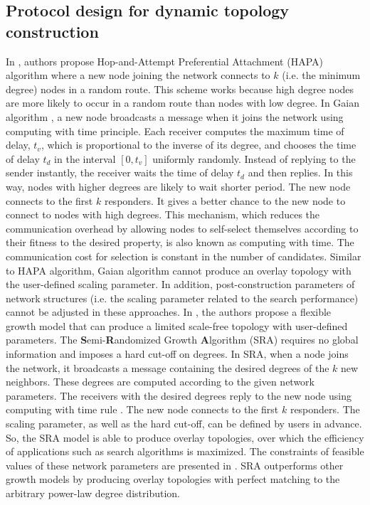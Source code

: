 \subsection{Protocol design for dynamic topology construction} 
In \cite{guclu2009limited}, authors propose Hop-and-Attempt Preferential Attachment (HAPA) algorithm\cite{guclu2009limited} where a new node joining the network connects to $k$ (i.e. the minimum degree) nodes in a random route. This scheme works because high degree nodes are more likely to occur in a random route than nodes with low degree. In Gaian algorithm \cite{bent2008dynamic}, a new node broadcasts a message when it joins the network using computing with time principle\cite{szymanski2008computing}. Each receiver computes the maximum time of delay, $t_v$, which is proportional to the inverse of its degree, and chooses the time of delay $t_d$ in the interval $[0, t_v]$ uniformly randomly. Instead of replying to the sender instantly, the receiver waits the time of delay $t_d$ and then replies. In this way, nodes with higher degrees are likely to wait shorter period. The new node connects to the first $k$ responders. It gives a better chance to the new node to connect to nodes with high degrees. This mechanism, which reduces the communication overhead by allowing nodes to self-select themselves according to their fitness to the desired property, is also known as computing with time\cite{szymanski2008computing}. The communication cost for selection is constant in the number of candidates. Similar to HAPA algorithm, Gaian algorithm cannot produce an overlay topology with the user-defined scaling parameter. In addition, post-construction parameters of network structures (i.e. the scaling parameter related to the search performance) cannot be adjusted in these approaches. In \cite{bulut2014constructing}, the authors propose a flexible growth model that can produce a limited scale-free topology with user-defined parameters. The \textbf{S}emi-\textbf{R}andomized Growth \textbf{A}lgorithm (SRA)\cite{bulut2014constructing} requires no global information and imposes a hard cut-off on degrees. In SRA, when a node joins the network, it broadcasts a message containing the desired degrees of the $k$ new neighbors. These degrees are computed according to the given network parameters. The receivers with the desired degrees reply to the new node using computing with time rule \cite{szymanski2008computing}. The new node connects to the first $k$ responders. The scaling parameter, as well as the hard cut-off, can be defined by users in advance. So, the SRA model is able to produce overlay topologies, over which the efficiency of applications such as search algorithms is maximized. The constraints of feasible values of these network parameters are presented in \cite{szymanski2011growing}. SRA outperforms other growth models by producing overlay topologies with perfect matching to the arbitrary power-law degree distribution.

